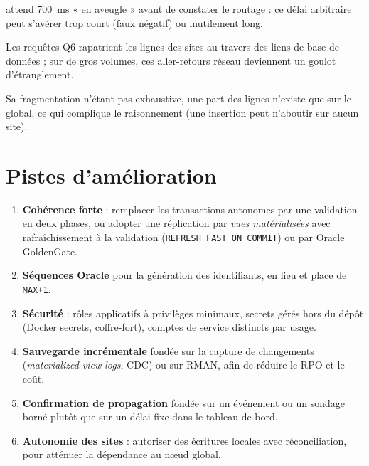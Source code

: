 \documentclass[11pt,a4paper]{article}
\begin{document}
\begin{description}[leftmargin=0.6cm,style=nextline]
    attend 700~ms « en aveugle » avant de constater le routage : ce délai
    arbitraire peut s'avérer trop court (faux négatif) ou inutilement long.
  \item[\textbf{Coût des jointures distribuées}] Les requêtes Q6 rapatrient les
    lignes des sites au travers des liens de base de données ; sur de gros
    volumes, ces aller-retours réseau deviennent un goulot d'étranglement.
  \item[\textbf{Asymétrie du scénario~1}] Sa fragmentation n'étant pas
    exhaustive, une part des lignes n'existe que sur le global, ce qui complique
    le raisonnement (une insertion peut n'aboutir sur aucun site).
\end{description}

\section{Pistes d'amélioration}

\begin{enumerate}[leftmargin=1.4cm]
  \item \textbf{Cohérence forte} : remplacer les transactions autonomes par une
    validation en deux phases, ou adopter une réplication par
    \emph{vues matérialisées} avec rafraîchissement à la validation
    (\texttt{REFRESH FAST ON COMMIT}) ou par Oracle GoldenGate.
  \item \textbf{Séquences Oracle} pour la génération des identifiants, en lieu et
    place de \texttt{MAX+1}.
  \item \textbf{Sécurité} : rôles applicatifs à privilèges minimaux, secrets
    gérés hors du dépôt (Docker secrets, coffre-fort), comptes de service
    distincts par usage.
  \item \textbf{Sauvegarde incrémentale} fondée sur la capture de changements
    (\emph{materialized view logs}, CDC) ou sur RMAN, afin de réduire le RPO et
    le coût.
  \item \textbf{Confirmation de propagation} fondée sur un événement ou un
    sondage borné plutôt que sur un délai fixe dans le tableau de bord.
  \item \textbf{Autonomie des sites} : autoriser des écritures locales avec
    réconciliation, pour atténuer la dépendance au nœud global.
\end{enumerate}
\end{document}

